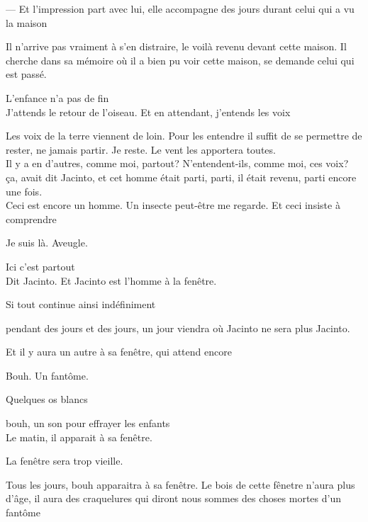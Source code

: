 --- Et l'impression part avec lui, elle accompagne des jours durant celui
  qui a vu la maison

Il n'arrive pas vraiment à s'en distraire, le voilà revenu devant cette
maison. Il cherche dans sa mémoire où il a bien pu voir cette maison, se
demande celui qui est passé.

L'enfance n'a pas de fin\\

J'attends le retour de l'oiseau. Et en attendant, j'entends les voix

Les voix de la terre viennent de loin. Pour les entendre il suffit de se
permettre de rester, ne jamais partir. Je reste. Le vent les apportera
toutes.\\

Il y a en d'autres, comme moi, partout? N'entendent-ils, comme moi, ces
voix?\\

ça, avait dit Jacinto, et cet homme était parti, parti, il était revenu,
parti encore une fois.\\

Ceci est encore un homme. Un insecte peut-être me regarde. Et ceci
insiste à comprendre

Je suis là. Aveugle.

Ici c'est partout\\

Dit Jacinto. Et Jacinto est l'homme à la fenêtre.

\clearpage
\thispagestyle{empty}
\movetooddpage

\vspace*{4cm}

Si tout continue ainsi indéfiniment

pendant des jours et des jours, un jour viendra où Jacinto ne sera plus
Jacinto.

Et il y aura un autre à sa fenêtre, qui attend encore

Bouh. Un fantôme.

Quelques os blancs

bouh, un son pour effrayer les enfants\\

Le matin, il apparait à sa fenêtre.

La fenêtre sera trop vieille.

Tous les jours, bouh apparaitra à sa fenêtre. Le bois de cette fênetre
n'aura plus d'âge, il aura des craquelures qui diront nous sommes des
choses mortes d'un fantôme\\

